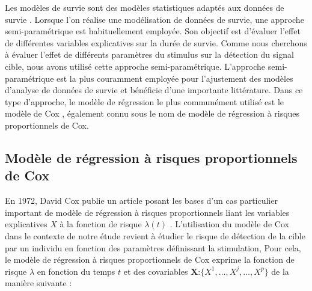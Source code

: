 Les modèles de survie sont des modèles statistiques adaptés aux données de survie \citep{andersen1993statistical}. 
Lorsque l'on réalise une modélisation de données de survie, une approche semi-paramétrique est habituellement employée. 
Son objectif est d'évaluer l'effet de différentes variables explicatives sur la durée de survie. 
Comme nous cherchons à évaluer l'effet de différents paramètres du stimulus sur la détection du signal cible, nous avons utilisé cette approche semi-paramétrique. 
L'approche semi-paramétrique est la plus couramment employée pour l’ajustement des modèles d'analyse de données de survie et bénéficie d'une importante littérature. 
Dans ce type d'approche, le modèle de régression le plus communément utilisé est le modèle de Cox \citep{cox1972regression}, également connu sous le nom de modèle de régression à risques proportionnels de Cox. 

\subsection{Modèle de régression à risques proportionnels de Cox}
\label{modeledecox}

En 1972, David Cox publie un article posant les bases d'un cas particulier important de modèle de régression à risques proportionnels liant les variables explicatives $X$ à la fonction de risque $\lambda(t)$ \citep{cox1972regression}. 
L'utilisation du modèle de Cox dans le contexte de notre étude revient à étudier le risque de détection de la cible par un individu en fonction des paramètres définissant la stimulation,
Pour cela, le modèle de régression à risques proportionnels de Cox exprime la fonction de risque $\lambda$ en fonction du temps $t$ et des covariables \textbf{X}:$\{X^1, \ldots, X^j, \ldots, X^p\}$ de la manière suivante :

